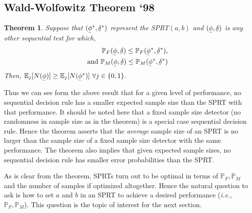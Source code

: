 \documentclass[a4paper,english,12pt]{article}
\newcommand{\ubar}[1]{\underaccent{\bar}{#1}}
\newtheorem{theorem}{Theorem}[section]
\begin{document}
\subsection{Wald-Wolfowitz Theorem `98}
\begin{theorem}
Suppose that $ (\ubar\phi^*,\ubar\delta^*) $ represent the SPRT$ (a,b) $ and $ (\ubar\phi,\ubar\delta) $ is any other sequential test for which,
\begin{eqnarray*}
\mathbb{P}_F(\ubar\phi,\ubar\delta)\leq \mathbb{P}_F(\ubar\phi^*,\ubar\delta^*), \\
\text{ and }\mathbb{P}_M(\ubar\phi,\ubar\delta) \leq \mathbb{P}_M(\ubar\phi^*,\ubar\delta^*)
\end{eqnarray*}
Then, $ \mathbb{E}_j[N(\ubar\phi)] \geq \mathbb{E}_j[N(\ubar\phi^*)] ~\forall j \in \{0,1\}. $
\end{theorem}
Thus we can see form the above result that for a given level of performance, no sequential decision rule has a smaller expected sample size than the SPRT with that performance. It should be noted here that a fixed sample size detector (no randomness in sample size as in the theorem) is a special case sequential decision rule. Hence the theorem asserts that the \textit{average} sample size of an SPRT is no larger than the sample size of a fixed sample size detector with the same performance. The theorem also implies that given expected sample sizes, no sequential decision rule has smaller error probabilities than the SPRT. 
\par As is clear from the theorem, SPRTs turn out to be optimal in terms of $\mathbb{P}_F, \mathbb{P}_M$ and the number of samples if optimized altogether. Hence the natural question to ask is how to set $a$ and $b$ in an SPRT to achieve a desired performance (\textit{i.e.,} $\mathbb{P}_F, \mathbb{P}_M$). This question is the topic of interest for the next section.
\end{document}
